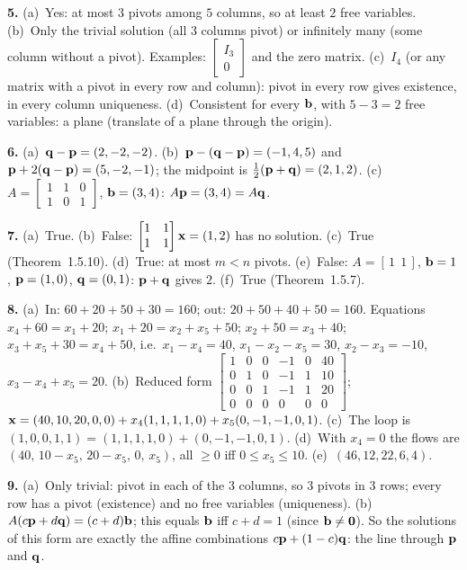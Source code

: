 \documentclass[11pt]{article}
\begin{document}
\begin{sol}
\textbf{5.} (a)~Yes: at most $3$ pivots among $5$ columns, so at least $2$ free variables. (b)~Only the trivial solution (all $3$ columns pivot) or infinitely many (some column without a pivot). Examples: $\begin{bmatrix}I_3\\0\end{bmatrix}$ and the zero matrix. (c)~$I_4$ (or any matrix with a pivot in every row and column): pivot in every row gives existence, in every column uniqueness. (d)~Consistent for every $\mathbf{b}$, with $5-3=2$ free variables: a plane (translate of a plane through the origin).

\textbf{6.} (a)~$\mathbf{q}-\mathbf{p}=(2,-2,-2)$. (b)~$\mathbf{p}-(\mathbf{q}-\mathbf{p})=(-1,4,5)$ and $\mathbf{p}+2(\mathbf{q}-\mathbf{p})=(5,-2,-1)$; the midpoint is $\tfrac12(\mathbf{p}+\mathbf{q})=(2,1,2)$. (c)~$A=\begin{bmatrix}1&1&0\\1&0&1\end{bmatrix}$, $\mathbf{b}=(3,4)$: $A\mathbf{p}=(3,4)=A\mathbf{q}$.

\textbf{7.} (a)~True. (b)~False: $\begin{bmatrix}1&1\\1&1\end{bmatrix}\mathbf{x}=(1,2)$ has no solution. (c)~True (Theorem~1.5.10). (d)~True: at most $m<n$ pivots. (e)~False: $A=[\,1\ \ 1\,]$, $\mathbf{b}=1$, $\mathbf{p}=(1,0)$, $\mathbf{q}=(0,1)$: $\mathbf{p}+\mathbf{q}$ gives $2$. (f)~True (Theorem~1.5.7).

\textbf{8.} (a)~In: $60+20+50+30=160$; out: $20+50+40+50=160$. Equations $x_4+60=x_1+20$; $x_1+20=x_2+x_5+50$; $x_2+50=x_3+40$; $x_3+x_5+30=x_4+50$, i.e.\ $x_1-x_4=40$, $x_1-x_2-x_5=30$, $x_2-x_3=-10$, $x_3-x_4+x_5=20$. (b)~Reduced form $\begin{bmatrix}1&0&0&-1&0&40\\0&1&0&-1&1&10\\0&0&1&-1&1&20\\0&0&0&0&0&0\end{bmatrix}$; $\mathbf{x}=(40,10,20,0,0)+x_4(1,1,1,1,0)+x_5(0,-1,-1,0,1)$. (c)~The loop is $(1,0,0,1,1)=(1,1,1,1,0)+(0,-1,-1,0,1)$. (d)~With $x_4=0$ the flows are $(40,\,10-x_5,\,20-x_5,\,0,\,x_5)$, all $\ge0$ iff $0\le x_5\le10$. (e)~$(46,12,22,6,4)$.

\textbf{9.} (a)~Only trivial: pivot in each of the $3$ columns, so $3$ pivots in $3$ rows; every row has a pivot (existence) and no free variables (uniqueness). (b)~$A(c\mathbf{p}+d\mathbf{q})=(c+d)\mathbf{b}$; this equals $\mathbf{b}$ iff $c+d=1$ (since $\mathbf{b}\neq\mathbf{0}$). So the solutions of this form are exactly the affine combinations $c\mathbf{p}+(1-c)\mathbf{q}$: the line through $\mathbf{p}$ and $\mathbf{q}$.
\end{sol}
\end{document}
